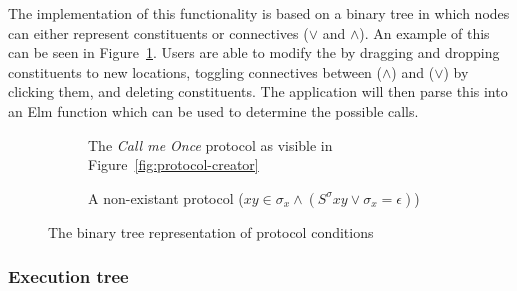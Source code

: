 The implementation of this functionality is based on a binary tree in which nodes can either represent constituents or connectives (\(\lor\) and \(\land\)). 
An example of this can be seen in Figure~\ref{fig:logic-tree}.
Users are able to modify the by dragging and dropping constituents to new locations,
toggling connectives between (\(\land\)) and (\(\lor\)) by clicking them,
and deleting constituents.
The application will then parse this into an Elm function which can be used to determine the possible calls.

\begin{figure}[htb!]
    \begin{subfigure}[t]{.45\linewidth}
        \centering
        \caption{The \emph{Call me Once} protocol as visible in Figure~\ref{fig:protocol-creator}}
    \end{subfigure}
    \hfill
    \begin{subfigure}[t]{.5\linewidth}
        \centering
        \caption{A non-existant protocol (\( xy \in \sigma_x \land ( S^\sigma xy \lor \sigma_x = \epsilon ) \))}
    \end{subfigure}
    \caption{The binary tree representation of protocol conditions}
    \label{fig:logic-tree}
\end{figure}

\subsubsection{Execution tree}

